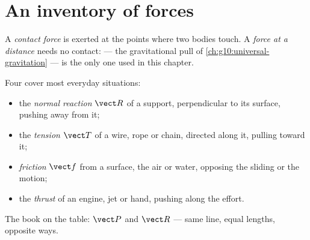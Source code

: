 \section{An inventory of forces}

\begin{definition}\label{def:g10:inertia:contact}
A \emph{contact force} is exerted at the points
where two bodies touch. A \emph{force at a distance} needs no contact:  --- the gravitational pull of
\cref{ch:g10:universal-gravitation} --- is the only one used in this
chapter.
\end{definition}

\begin{definition}\label{def:g10:inertia:inventory}
Four  cover most everyday situations:
\begin{itemize}
  \item the \emph{normal reaction} $\vect R$ of
        a support, perpendicular to its surface, pushing away from it;
  \item the \emph{tension} $\vect T$ of a wire, rope or
        chain, directed along it, pulling toward it;
  \item \emph{friction} $\vect f$ from a surface, the
        air or water, opposing the sliding or the motion;
  \item the \emph{thrust} of an engine, jet or hand,
        pushing along the effort.
\end{itemize}
\end{definition}

\begin{omfigure}

{\small The book on the table:  $\vect P$ and 
$\vect R$ --- same line, equal lengths, opposite ways.}
\end{omfigure}

